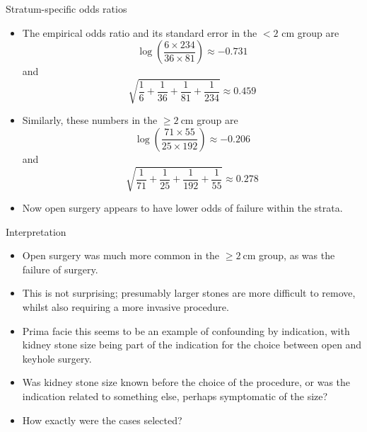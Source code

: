 \documentclass[10pt]{beamer}\usepackage[]{graphicx}\usepackage[]{color}
\begin{document}
\begin{frame}{Stratum-specific odds ratios}
	\begin{itemize}
		\item The empirical odds ratio and its standard error in the $<2$
		cm group are
		$$
		\log \left(\frac{6 \times 234}{36 \times 81}\right) \approx-0.731
		$$
		and
		$$
		\sqrt{\frac{1}{6}+\frac{1}{36}+\frac{1}{81}+\frac{1}{234}} \approx 0.459
		$$
		\item Similarly, these numbers in the $\geq 2 \mathrm{~cm}$ group are
		$$
		\log \left(\frac{71 \times 55}{25 \times 192}\right) \approx-0.206
		$$
		and
		$$
		\sqrt{\frac{1}{71}+\frac{1}{25}+\frac{1}{192}+\frac{1}{55}} \approx 0.278
		$$
		\item Now open surgery appears to have lower odds of failure within the strata.
	\end{itemize}
	
\end{frame}


\begin{frame}{Interpretation}
\begin{itemize}
	\item Open surgery was much more common in the $\geq 2 \mathrm{~cm}$ group, as was the failure of surgery.
	\item  This is not surprising; presumably larger stones are more difficult to remove, whilst also requiring a more invasive procedure.
	\item  Prima facie this seems to be an example of confounding by indication, with kidney stone size being part of the indication for the choice between open and keyhole
	surgery.
	\item  Was kidney stone size known before the choice of the procedure, or was the indication related to something else, perhaps symptomatic of the size?
	\item  How exactly were the cases selected?
\end{itemize}
\end{frame}
\end{document}
